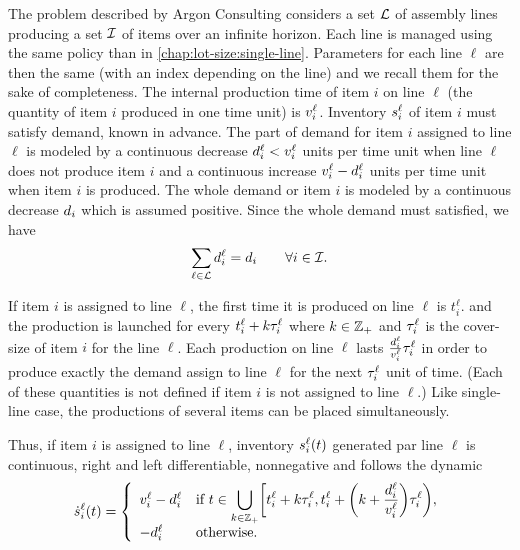 The problem described by Argon Consulting considers a set $\mathcal{L}$ of assembly lines producing a set $\mathcal{I}$ of items over an infinite horizon.
Each line is managed using the same policy than in \cref{chap:lot-size:single-line}.
Parameters for each line $\ell$ are then the same (with an index depending on the line) and we recall them for the sake of completeness.
The internal production time of item $i$ on line $\ell$ (\ie the quantity of item $i$ produced in one time unit) is $v_i^{\ell}$.
Inventory $s_i^\ell$ of item $i$ must satisfy demand, known in advance.
The part of demand for item $i$ assigned to line $\ell$ is modeled by a continuous decrease $d_i^{\ell}<v_i^{\ell}$ units per time unit when line $\ell$ does not produce item $i$ and a continuous increase $v_i^{\ell}-d_i^{\ell}$ units per time unit when item $i$ is produced.
The whole demand or item $i$ is modeled by a continuous decrease $d_i$ which is assumed positive.
Since the whole demand must satisfied, we have
\begin{equation}\label{eq:lot-size:multi-line:motivations:whole-demand}
  \sum_{\ell\in\mathcal{L}}d_i^{\ell}=d_i\qquad\forall i\in\mathcal{I}.
\end{equation}


If item $i$ is assigned to line $\ell$, the first time it is produced on line $\ell$ is $t_i^{\ell}$.
and the production is launched for every $t_i^{\ell}+k\tau_i^{\ell}$ where $k\in\mathbb{Z}_+$ and $\tau_i^{\ell}$ is the cover-size of item $i$ for the line $\ell$.
Each production on line $\ell$ lasts $\frac{d_i^{\ell}}{v_i^{\ell}}\tau_i^{\ell}$ in order to produce exactly the demand assign to line $\ell$ for the next $\tau_i^{\ell}$ unit of time.
(Each of these quantities is not defined if item $i$ is not assigned to line $\ell$.)
Like single-line case, the productions of several items can be placed simultaneously.


Thus, if item $i$ is assigned to line $\ell$, inventory $\inventory_i^{\ell}\bracket{t}$ generated par line $\ell$ is continuous, right and left differentiable, nonnegative and follows the dynamic
\begin{equation}\label{eq:lot-size:multi-line:motivations:dynamic}
  \dot{\inventory}_i^{\ell}\bracket{t} =
  \left\{
  \begin{array}{ll}
  \rate_i^{\ell}-\demand_i^{\ell}
  & \ds\mbox{if}\ t\in\bigcup_{k\in\ZZ_+} \left[t_i^{\ell}+k\cover_i^{\ell},t_i^{\ell}+\bracket{k+\frac{\demand_i^{\ell}}{\rate_i^{\ell}}}\cover_i^{\ell}\right),
  \\
  -\demand_i^{\ell}
  & \mbox{otherwise}.
  \end{array}
  \right.
\end{equation}


